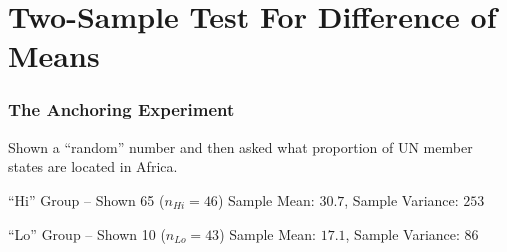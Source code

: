 \section{Two-Sample Test For Difference of Means}
\begin{frame}
\frametitle{The Anchoring Experiment}
Shown a ``random'' number and then asked what proportion of UN member states are located in Africa.
	\begin{block}{``Hi'' Group -- Shown 65 ($n_{Hi}=46$)}
		Sample Mean: $30.7$, Sample Variance: $253$
\end{block}


	\begin{block}{``Lo'' Group -- Shown 10 ($n_{Lo}=43$)}
	Sample Mean: $17.1$, Sample Variance: $86$
\end{block}


\vspace{1em}

\hfill\alert{}
\end{frame}

